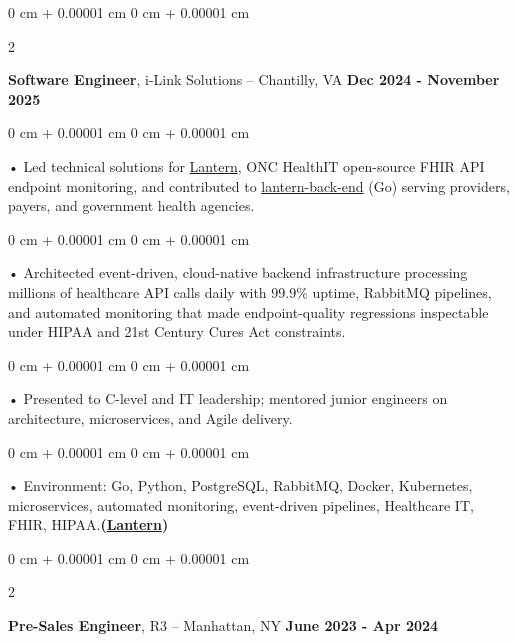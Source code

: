 \documentclass[10pt, letterpaper]{article}
\newenvironment{onecolentry}{
    \begin{adjustwidth}{
        0 cm + 0.00001 cm
    }{
        0 cm + 0.00001 cm
    }
}{
    \end{adjustwidth}
} %
\newenvironment{twocolentry}[2][]{
    \onecolentry
    \def\secondColumn{#2}
    \setcolumnwidth{\fill, 4.5 cm}
    \begin{paracol}{2}
}{
    \switchcolumn \raggedleft \secondColumn
    \end{paracol}
    \endonecolentry
} %
\begin{document}
        \vspace{0.1cm}

        \begin{twocolentry}{
            \textbf{Dec 2024 - November 2025}
        }
            \textbf{Software Engineer}, i-Link Solutions -- Chantilly, VA\end{twocolentry}


        \begin{onecolentry}
             • Led technical solutions for \href{https://lantern.healthit.gov/?tab=dashboard_tab}{Lantern}, ONC HealthIT open-source FHIR API endpoint monitoring, and contributed to \href{https://github.com/onc-healthit/lantern-back-end}{lantern-back-end} (Go) serving providers, payers, and government health agencies.
        \end{onecolentry}
        \begin{onecolentry}
             • Architected event-driven, cloud-native backend infrastructure processing millions of healthcare API calls daily with 99.9\% uptime, RabbitMQ pipelines, and automated monitoring that made endpoint-quality regressions inspectable under HIPAA and 21st Century Cures Act constraints.
        \end{onecolentry}
        \begin{onecolentry}
             • Presented to C-level and IT leadership; mentored junior engineers on architecture, microservices, and Agile delivery.
        \end{onecolentry}

        \begin{onecolentry}
             • Environment: Go, Python, PostgreSQL, RabbitMQ, Docker, Kubernetes, microservices, automated monitoring, event-driven pipelines, Healthcare IT, FHIR, HIPAA.\textbf{(\href{https://lantern.healthit.gov/?tab=dashboard_tab}{Lantern})}
        \end{onecolentry}
        \vspace{0.1cm}

        \begin{twocolentry}{
            \textbf{June 2023 - Apr 2024}
        }
            \textbf{Pre-Sales Engineer}, R3 -- Manhattan, NY\end{twocolentry}
\end{document}
